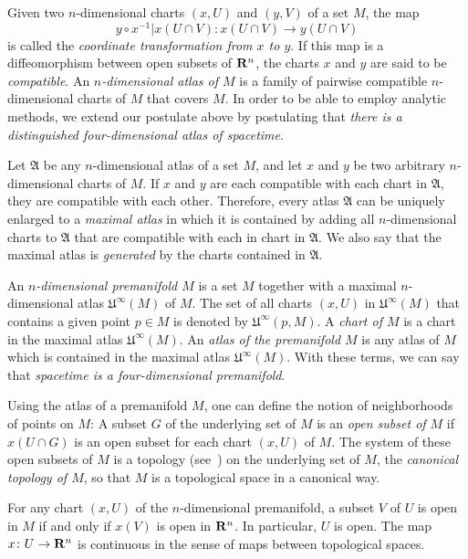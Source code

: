 Given two $n$-dimensional charts $(x, U)$ and $(y, V)$ of a set $M$, the map
\[
  y \circ x^{-1}|x(U \cap V)\colon x(U \cap V) \to y(U \cap V)
\]
is called the
\emph{coordinate transformation from $x$ to $y$}. If this map is a diffeomorphism
between open subsets of $\mathbf{R}^n$, the charts $x$ and $y$ are said to be
\emph{compatible}.
An \emph{$n$-dimensional atlas of $M$} is a family of pairwise compatible
$n$-dimensional charts of $M$ that covers $M$. In order to be able to employ 
analytic methods, we extend our postulate above by postulating that
\emph{there is a distinguished four-dimensional atlas of spacetime}.

Let $\mathfrak A$ be any $n$-dimensional atlas of a set $M$, and let $x$ and $y$
be two arbitrary $n$-dimensional charts of $M$. If $x$ and $y$ are each compatible
with each chart in $\mathfrak A$, they are compatible with each other. Therefore,
every atlas $\mathfrak A$ can be uniquely enlarged to a \emph{maximal atlas} in
which it is contained by adding all $n$-dimensional charts to $\mathfrak A$ that
are compatible with each in chart in $\mathfrak A$. We also say that the maximal
atlas is \emph{generated} by the charts contained in $\mathfrak A$.

An \emph{$n$-dimensional premanifold $M$} is a set $M$ together
with a maximal $n$-dimensional atlas $\mathfrak U^\infty(M)$ of $M$. The set of
all charts $(x, U)$ in $\mathfrak U^\infty(M)$ that contains a given point $p \in M$ is 
denoted by $\mathfrak U^\infty(p, M)$. A \emph{chart of $M$} is a chart in the
maximal atlas $\mathfrak U^\infty(M)$.
An \emph{atlas of the premanifold $M$} is any atlas of $M$ which is contained in
the maximal atlas $\mathfrak U^\infty(M)$. With these terms, we can say that
\emph{spacetime is a four-dimensional premanifold}.

Using the atlas of a premanifold $M$, one can define the notion of neighborhoods
of points on $M$: A subset $G$ of the underlying set of $M$ is an \emph{open subset
of $M$} if $x(U \cap G)$ is an open subset for each chart $(x, U)$ of $M$. The
system of these open subsets of $M$ is a topology (see~)
on the underlying set of $M$, the \emph{canonical topology of $M$}, so that $M$
is a topological space in a canonical way.

For any chart $(x, U)$ of the $n$-dimensional premanifold, a subset $V$ of $U$
is open in $M$ if and only if $x(V)$ is open in $\mathbf{R}^n$. In particular, $U$ is open.
The map $x\colon U \to \mathbf{R}^n$ is continuous in the sense of maps between
topological spaces.


